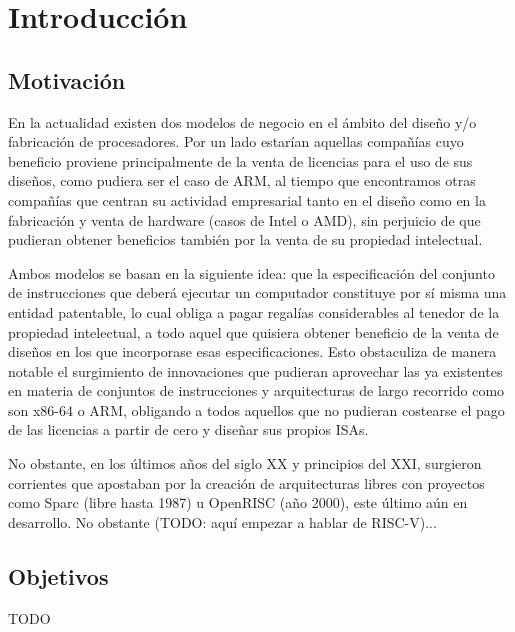 \documentclass[12pt]{report}
\begin{document}
\chapter{Introducción}
\section{Motivación}
En la actualidad existen dos modelos de negocio en el ámbito del diseño y/o fabricación de procesadores. Por un lado estarían aquellas compañías cuyo beneficio proviene principalmente de la venta de licencias para el uso de sus diseños, como pudiera ser el caso de ARM, al tiempo que encontramos otras compañías que centran su actividad empresarial tanto en el diseño como en la fabricación y venta de hardware (casos de Intel o AMD), sin perjuicio de que pudieran obtener beneficios también por la venta de su propiedad intelectual.

Ambos modelos se basan en la siguiente idea: que la especificación del conjunto de instrucciones que deberá ejecutar un computador constituye por sí misma una entidad patentable, lo cual obliga a pagar regalías considerables al tenedor de la propiedad intelectual, a todo aquel que quisiera obtener beneficio de la venta de diseños en los que incorporase esas especificaciones. Esto obstaculiza de manera notable el surgimiento de innovaciones que pudieran aprovechar las ya existentes en materia de conjuntos de instrucciones y arquitecturas de largo recorrido como son x86-64 o ARM, obligando a todos aquellos que no pudieran costearse el pago de las licencias a partir de cero y diseñar sus propios ISAs.

No obstante, en los últimos años del siglo XX y principios del XXI, surgieron corrientes que apostaban por la creación de arquitecturas libres con proyectos como Sparc (libre hasta 1987) u OpenRISC (año 2000), este último aún en desarrollo. No obstante (TODO: aquí empezar a hablar de RISC-V)...

\section{Objetivos}
TODO
\end{document}

